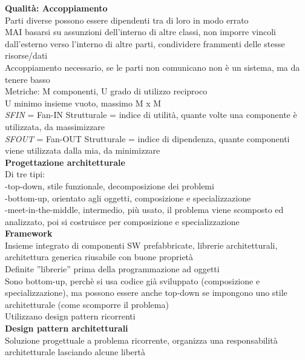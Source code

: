 \documentclass{article}
\begin{document}
		\textbf{Qualità: Accoppiamento}\\
		Parti diverse possono essere dipendenti tra di loro in modo errato\\
		MAI basarsi su assunzioni dell'interno di altre classi, non imporre vincoli dall'esterno verso l'interno di altre parti, condividere frammenti delle stesse risorse/dati\\
		Accoppiamento necessario, se le parti non comunicano non è un sistema, ma da tenere basso\\
		Metriche: M componenti, U grado di utilizzo reciproco\\
		U minimo insieme vuoto, massimo M x M\\
		\textit{SFIN} = Fan-IN Strutturale = indice di utilità, quante volte una componente è utilizzata, da massimizzare\\
		\textit{SFOUT} = Fan-OUT Strutturale = indice di dipendenza, quante componenti viene utilizzata dalla mia, da minimizzare\\
		
		\textbf{Progettazione architetturale}\\
		Di tre tipi:\\
		-top-down, stile funzionale, decomposizione dei problemi\\
		-bottom-up, orientato agli oggetti, composizione e specializzazione\\
		-meet-in-the-middle, intermedio, più usato, il problema viene scomposto ed analizzato, poi si costruisce per composizione e specializzazione\\
		
		\textbf{Framework}\\
		Insieme integrato di componenti SW prefabbricate, librerie architetturali, architettura generica riusabile con buone proprietà\\
		Definite ''librerie'' prima della programmazione ad oggetti\\
		Sono bottom-up, perchè si usa codice già sviluppato (composizione e specializzazione), ma possono essere anche top-down se impongono uno stile architetturale (come scomporre il problema)\\
		Utilizzano design pattern ricorrenti\\
		
		\textbf{Design pattern architetturali}\\
		Soluzione progettuale a problema ricorrente, organizza una responsabilità architetturale lasciando alcune libertà\\
		
\end{document}
